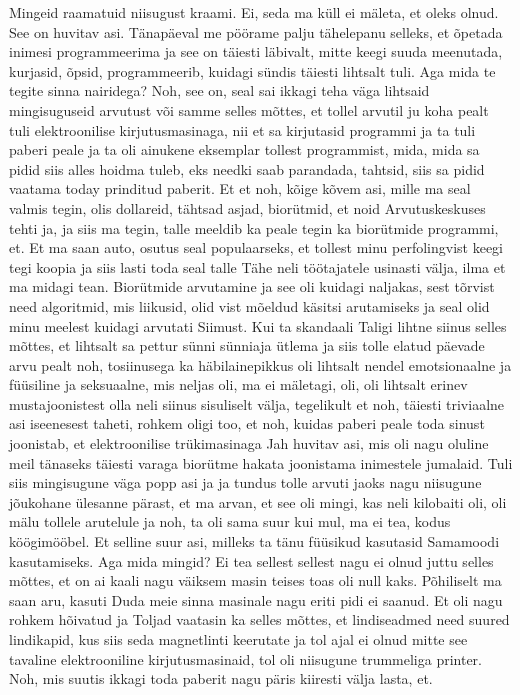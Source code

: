Mingeid raamatuid niisugust kraami.
Ei, seda ma küll ei mäleta, et oleks olnud.
See on huvitav asi. Tänapäeval me pöörame palju tähelepanu selleks, et õpetada inimesi programmeerima ja see on täiesti läbivalt, mitte keegi suuda meenutada, kurjasid, õpsid, programmeerib, kuidagi sündis täiesti lihtsalt tuli. Aga mida te tegite sinna nairidega?
Noh, see on, seal sai ikkagi teha väga lihtsaid mingisuguseid arvutust või samme selles mõttes, et tollel arvutil ju koha pealt tuli elektroonilise kirjutusmasinaga, nii et sa kirjutasid programmi ja ta tuli paberi peale ja ta oli ainukene eksemplar tollest programmist, mida, mida sa pidid siis alles hoidma tuleb, eks needki saab parandada, tahtsid, siis sa pidid vaatama today prinditud paberit. Et et noh, kõige kõvem asi, mille ma seal valmis tegin, olis dollareid, tähtsad asjad, biorütmid, et noid Arvutuskeskuses tehti ja, ja siis ma tegin, talle meeldib ka peale tegin ka biorütmide programmi, et.
Et ma saan auto, osutus seal populaarseks, et tollest minu perfolingvist keegi tegi koopia ja siis lasti toda seal talle Tähe neli töötajatele usinasti välja, ilma et ma midagi tean.
Biorütmide arvutamine ja see oli kuidagi naljakas, sest tõrvist need algoritmid, mis liikusid, olid vist mõeldud käsitsi arutamiseks ja seal olid minu meelest kuidagi arvutati Siimust.
Kui ta skandaali Taligi lihtne siinus selles mõttes, et lihtsalt sa pettur sünni sünniaja ütlema ja siis tolle elatud päevade arvu pealt noh, tosiinusega ka häbilainepikkus oli lihtsalt nendel emotsionaalne ja füüsiline ja seksuaalne, mis neljas oli, ma ei mäletagi, oli, oli lihtsalt erinev mustajoonistest olla neli siinus sisuliselt välja, tegelikult et noh, täiesti triviaalne asi iseenesest taheti, rohkem oligi too, et noh, kuidas paberi peale toda sinust joonistab, et elektroonilise trükimasinaga
Jah huvitav asi, mis oli nagu oluline meil tänaseks täiesti varaga biorütme hakata joonistama inimestele jumalaid.
Tuli siis mingisugune väga popp asi ja ja tundus tolle arvuti jaoks nagu niisugune jõukohane ülesanne pärast, et ma arvan, et see oli mingi, kas neli kilobaiti oli, oli mälu tollele arutelule ja noh, ta oli sama suur kui mul, ma ei tea, kodus köögimööbel.
Et selline suur asi, milleks ta tänu füüsikud kasutasid
Samamoodi kasutamiseks.
Aga mida mingid?
Ei tea sellest sellest nagu ei olnud juttu selles mõttes, et on ai kaali nagu väiksem masin teises toas oli null kaks. Põhiliselt ma saan aru, kasuti Duda meie sinna masinale nagu eriti pidi ei saanud. Et oli nagu rohkem hõivatud ja Toljad vaatasin ka selles mõttes, et lindiseadmed need suured lindikapid, kus siis seda magnetlinti keerutate ja tol ajal ei olnud mitte see tavaline elektrooniline kirjutusmasinaid, tol oli niisugune trummeliga printer. Noh, mis suutis ikkagi toda paberit nagu päris kiiresti välja lasta, et.
